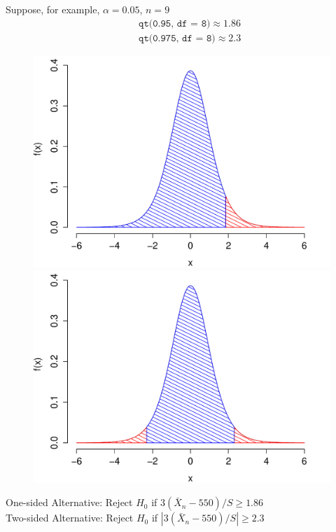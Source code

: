 \begin{frame}
Suppose, for example, $\alpha = 0.05$, $n = 9$
	\begin{eqnarray*}
		&&\texttt{qt(0.95, df  = 8)}\approx 1.86\\
		 &&\texttt{qt(0.975, df  = 8)}\approx 2.3
	\end{eqnarray*}
\begin{figure}
\includegraphics[scale = 0.3]{./images/one_side}
\includegraphics[scale = 0.3]{./images/two_side}
\end{figure}
One-sided Alternative: Reject $H_0$ if $3(\bar{X}_n - 550)/S \geq 1.86$\\
\vspace{0.5em}
Two-sided Alternative: Reject $H_0$ if $\left|3(\bar{X}_n - 550)/S\right| \geq 2.3$\\

\end{frame}

